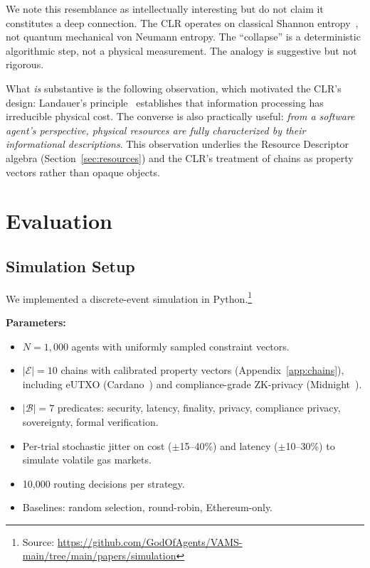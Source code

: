 \documentclass[conference, 10pt, twocolumn]{IEEEtran}
\begin{document}
We note this resemblance as intellectually interesting but do not
claim it constitutes a deep connection.  The CLR operates on classical
Shannon entropy~\cite{shannon1948mathematical}, not quantum mechanical
von Neumann entropy.  The ``collapse'' is a deterministic algorithmic
step, not a physical measurement.  The analogy is suggestive but not
rigorous.

What \emph{is} substantive is the following observation, which
motivated the CLR's design: Landauer's
principle~\cite{landauer1961irreversibility} establishes that
information processing has irreducible physical cost.  The converse
is also practically useful: \emph{from a software agent's perspective,
physical resources are fully characterized by their informational
descriptions}.  This observation underlies the Resource Descriptor
algebra (Section~\ref{sec:resources}) and the CLR's treatment of
chains as property vectors rather than opaque objects.

\section{Evaluation}
\label{sec:evaluation}

\subsection{Simulation Setup}

We implemented a discrete-event simulation in
Python.\footnote{Source: \url{https://github.com/GodOfAgents/VAMS-main/tree/main/papers/simulation}}

\textbf{Parameters:}
\begin{itemize}[leftmargin=*]
  \item $N = 1{,}000$ agents with uniformly sampled constraint vectors.
  \item $|\mathcal{E}| = 10$ chains with calibrated property
    vectors (Appendix~\ref{app:chains}), including eUTXO
    (Cardano~\cite{cardano2020ouroboros}) and compliance-grade
    ZK-privacy (Midnight~\cite{midnight2024}).
  \item $|\mathcal{B}| = 7$ predicates: security, latency, finality,
    privacy, compliance privacy, sovereignty, formal verification.
  \item Per-trial stochastic jitter on cost ($\pm$15--40\%) and
    latency ($\pm$10--30\%) to simulate volatile gas markets.
  \item 10{,}000 routing decisions per strategy.
  \item Baselines: random selection, round-robin, Ethereum-only.
\end{itemize}
\end{document}
